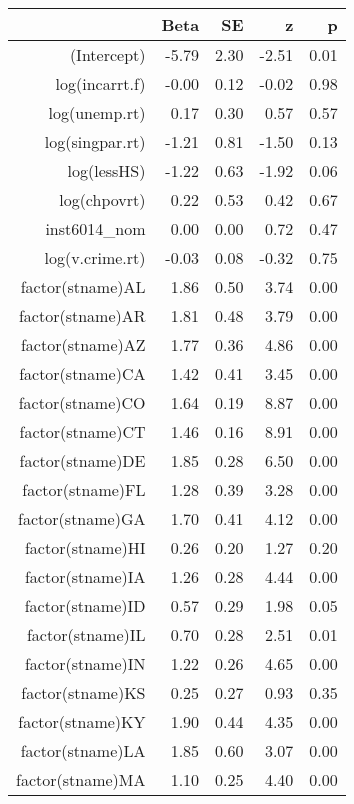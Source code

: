 \begin{table}[ht]
\centering
\begin{tabular}{rrrrr}
  \hline
 & Beta & SE & z & p \\ 
  \hline
(Intercept) & -5.79 & 2.30 & -2.51 & 0.01 \\ 
  log(incarrt.f) & -0.00 & 0.12 & -0.02 & 0.98 \\ 
  log(unemp.rt) & 0.17 & 0.30 & 0.57 & 0.57 \\ 
  log(singpar.rt) & -1.21 & 0.81 & -1.50 & 0.13 \\ 
  log(lessHS) & -1.22 & 0.63 & -1.92 & 0.06 \\ 
  log(chpovrt) & 0.22 & 0.53 & 0.42 & 0.67 \\ 
  inst6014\_nom & 0.00 & 0.00 & 0.72 & 0.47 \\ 
  log(v.crime.rt) & -0.03 & 0.08 & -0.32 & 0.75 \\ 
  factor(stname)AL & 1.86 & 0.50 & 3.74 & 0.00 \\ 
  factor(stname)AR & 1.81 & 0.48 & 3.79 & 0.00 \\ 
  factor(stname)AZ & 1.77 & 0.36 & 4.86 & 0.00 \\ 
  factor(stname)CA & 1.42 & 0.41 & 3.45 & 0.00 \\ 
  factor(stname)CO & 1.64 & 0.19 & 8.87 & 0.00 \\ 
  factor(stname)CT & 1.46 & 0.16 & 8.91 & 0.00 \\ 
  factor(stname)DE & 1.85 & 0.28 & 6.50 & 0.00 \\ 
  factor(stname)FL & 1.28 & 0.39 & 3.28 & 0.00 \\ 
  factor(stname)GA & 1.70 & 0.41 & 4.12 & 0.00 \\ 
  factor(stname)HI & 0.26 & 0.20 & 1.27 & 0.20 \\ 
  factor(stname)IA & 1.26 & 0.28 & 4.44 & 0.00 \\ 
  factor(stname)ID & 0.57 & 0.29 & 1.98 & 0.05 \\ 
  factor(stname)IL & 0.70 & 0.28 & 2.51 & 0.01 \\ 
  factor(stname)IN & 1.22 & 0.26 & 4.65 & 0.00 \\ 
  factor(stname)KS & 0.25 & 0.27 & 0.93 & 0.35 \\ 
  factor(stname)KY & 1.90 & 0.44 & 4.35 & 0.00 \\ 
  factor(stname)LA & 1.85 & 0.60 & 3.07 & 0.00 \\ 
  factor(stname)MA & 1.10 & 0.25 & 4.40 & 0.00 \\ 

\end{tabular}
\end{table}
